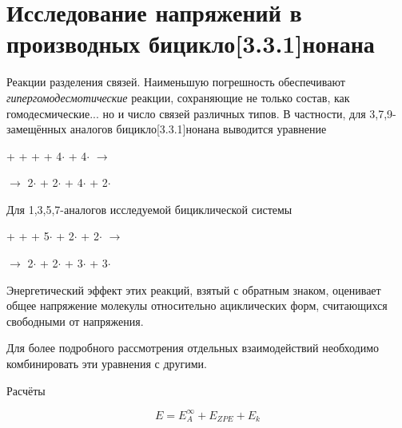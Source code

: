 \chapter{Исследование напряжений в производных бицикло[3.3.1]нонана}

Реакции разделения связей. Наименьшую погрешность обеспечивают \emph{гипергомодесмотические} реакции, сохраняющие не только состав, как гомодесмические... но и число связей различных типов. В частности, для 3,7,9-замещённых аналогов бицикло[3.3.1]нонана выводится уравнение
\begin{center}
  +  +  +  + 4\(\cdot\) 
  + 4\(\cdot\)
  \(\longrightarrow\)
  
  \(\longrightarrow\) 
  2\(\cdot\) + 2\(\cdot\) + 4\(\cdot\) + 
  2\(\cdot\)
\end{center}

Для 1,3,5,7-аналогов исследуемой бициклической системы
\begin{center}
  +  +  + 5\(\cdot\) 
  + 2\(\cdot\)
  + 2\(\cdot\)
  \(\longrightarrow\)
  
  \(\longrightarrow\) 
  2\(\cdot\) + 2\(\cdot\) + 3\(\cdot\) + 3\(\cdot\)
\end{center}

Энергетический эффект этих реакций, взятый с обратным знаком, оценивает общее напряжение молекулы относительно ациклических форм, считающихся свободными от напряжения. 

Для более подробного рассмотрения отдельных взаимодействий необходимо комбинировать эти уравнения с другими.

Расчёты 

\begin{equation}
E = E_A^\infty + E_{ZPE} + E_k
\end{equation}

